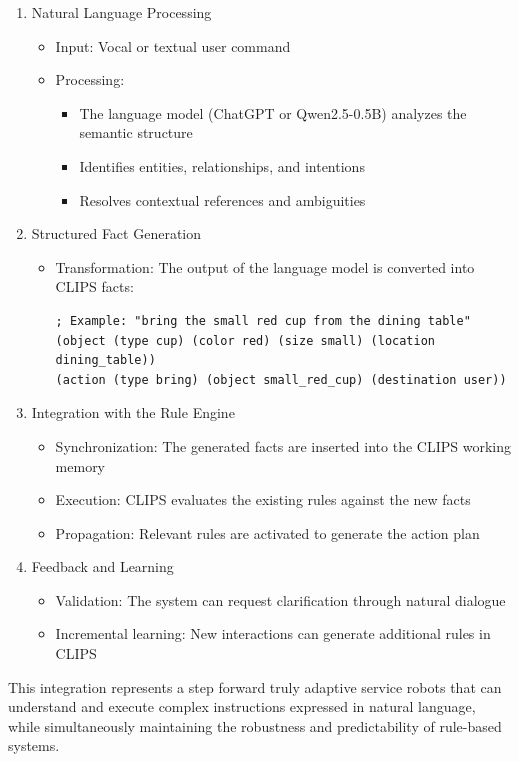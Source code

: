 \begin{enumerate}
\item Natural Language Processing
    \begin{itemize}
    \item Input: Vocal or textual user command
    \item Processing:
        \begin{itemize}
        \item The language model (ChatGPT or Qwen2.5-0.5B) analyzes the semantic structure
        \item Identifies entities, relationships, and intentions
        \item Resolves contextual references and ambiguities
        \end{itemize}
    \end{itemize}
    
\item Structured Fact Generation
    \begin{itemize}
    \item Transformation: The output of the language model is converted into CLIPS facts:
    
\begin{verbatim}
; Example: "bring the small red cup from the dining table"
(object (type cup) (color red) (size small) (location dining_table))
(action (type bring) (object small_red_cup) (destination user))
\end{verbatim}
    \end{itemize}
    
\item Integration with the Rule Engine
    \begin{itemize}
    \item Synchronization: The generated facts are inserted into the CLIPS working memory
    \item Execution: CLIPS evaluates the existing rules against the new facts
    \item Propagation: Relevant rules are activated to generate the action plan
    \end{itemize}
    
\item Feedback and Learning
    \begin{itemize}
        \item Validation: The system can request clarification through natural dialogue
        \item Incremental learning: New interactions can generate additional rules in CLIPS
    \end{itemize}
\end{enumerate}

This integration represents a step forward truly adaptive service robots that can understand and execute complex instructions expressed in natural language, while simultaneously maintaining the robustness and predictability of rule-based systems.